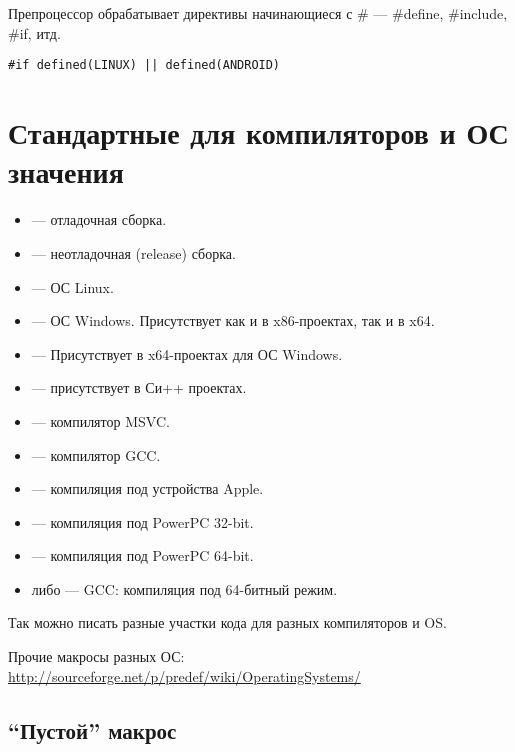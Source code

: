 ﻿\section{}

Препроцессор обрабатывает директивы начинающиеся с \# --- \#define, \#include, \#if, итд.

\begin{lstlisting}[caption=``или'']
#if defined(LINUX) || defined(ANDROID)
\end{lstlisting}

\section{Стандартные для компиляторов и ОС значения}

\begin{itemize}
\item {} --- отладочная сборка.
\item {} --- неотладочная (release) сборка.
\item {} --- ОС Linux.
\item {} --- ОС Windows. Присутствует как и в x86-проектах, так и в x64.
\item {} --- Присутствует в x64-проектах для ОС Windows.
\item {} --- присутствует в Си++ проектах.
\item {} --- компилятор MSVC.
\item {} --- компилятор GCC.
\item {} --- компиляция под устройства Apple.
\item {} --- компиляция под PowerPC 32-bit.
\item {} --- компиляция под PowerPC 64-bit.
\item {} либо  --- GCC: компиляция под 64-битный режим.
\end{itemize}

Так можно писать разные участки кода для разных компиляторов и \ac{OS}.

Прочие макросы разных ОС: \url{http://sourceforge.net/p/predef/wiki/OperatingSystems/}

\subsection{``Пустой'' макрос}


